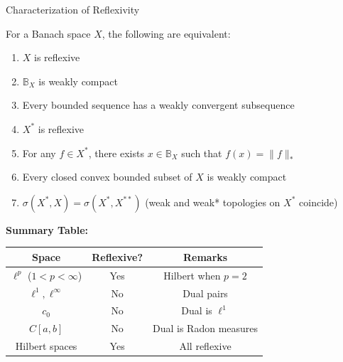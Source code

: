\documentclass[aspectratio=169,10pt]{beamer}
\begin{document}
\begin{frame}{Characterization of Reflexivity}
  \begin{theorem}[Theorem 1.32]
    For a Banach space $X$, the following are equivalent:
    \begin{enumerate}
      \item $X$ is reflexive
      \item $\mathbb{B}_X$ is weakly compact
      \item Every bounded sequence has a weakly convergent subsequence
      \item $X^*$ is reflexive
      \item For any $f \in X^*$, there exists $x \in \mathbb{B}_X$ such that $f(x) = \|f\|_*$
      \item Every closed convex bounded subset of $X$ is weakly compact
      \item $\sigma(X^*, X) = \sigma(X^*, X^{**})$ (weak and weak* topologies on $X^*$ coincide)
    \end{enumerate}
  \end{theorem}

  \vspace{0.3cm}
  \textbf{Summary Table:}
  \begin{center}
    \begin{tabular}{|c|c|c|}
      \hline
      \textbf{Space} & \textbf{Reflexive?} & \textbf{Remarks} \\
      \hline
      $\ell^p$ ($1 < p < \infty$) & Yes & Hilbert when $p=2$ \\
      $\ell^1, \ell^\infty$ & No & Dual pairs \\
      $c_0$ & No & Dual is $\ell^1$ \\
      $C[a,b]$ & No & Dual is Radon measures \\
      Hilbert spaces & Yes & All reflexive \\
      \hline
    \end{tabular}
  \end{center}
\end{frame}
\end{document}
